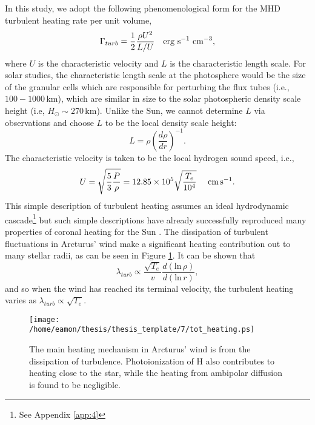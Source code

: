 In this study, we adopt the following phenomenological form for the MHD turbulent heating rate per unit volume,
\begin{equation}
\Gamma_{turb} =\frac{1}{2}\frac{\rho U^{2}}{L/U}\ \ \ \rm{erg \ s^{-1} \ cm^{-3}},
\end{equation} 
where $U$ is the characteristic velocity and $L$ is the characteristic length scale. For solar studies, the characteristic length scale at the photosphere would be the size of the granular cells which are responsible for perturbing the flux tubes (i.e., $100-1000$\,km), which are similar in size to the solar photospheric density scale height (i.e, $H_{\odot} \sim 270$\,km). Unlike the Sun, we cannot determine $L$ via observations and choose $L$ to be the local density scale height:
\begin{equation}
L = \rho \left(\dfrac{d\rho}{dr} \right)^{-1}.
\end{equation}
The characteristic velocity is taken to be the local hydrogen sound speed, i.e., 
\begin{equation}
U=\sqrt{\frac{5}{3}\dfrac{P}{\rho}}=12.85\times 10^{5}\sqrt{\frac{T_{e}}{10^4}}\ \ \ \ \rm{cm}\,\rm{s}^{-1}.
\end{equation}
This simple description of turbulent heating assumes an ideal \cite{kolmogorov_1941} hydrodynamic cascade\footnote{See Appendix \ref{app:4}} but such simple descriptions have already successfully reproduced many properties of coronal heating for the Sun \citep{cranmer_2012}. The dissipation of turbulent fluctuations in Arcturus' wind make a significant heating contribution out to many stellar radii, as can be seen in Figure \ref{fig:7.5}. It can be shown that 
\begin{equation}
\lambda_{turb} \propto \frac{\sqrt{T_e}}{v}\frac{d(\mathrm{ln}\,\rho)}{d(\mathrm{ln}\,r)},
\end{equation} 
and so when the wind has reached its terminal velocity, the turbulent heating varies as $\lambda_{turb} \propto \sqrt{T_e}$.

\begin{figure}[!ht]
\centering 
         \texttt{[image: /home/eamon/thesis/thesis\_template/7/tot\_heating.ps]}
\caption[Main heating mechanisms in Arcturus' wind]{The main heating mechanism in Arcturus' wind is from the dissipation of turbulence. Photoionization of H also contributes to heating close to the star, while the heating from ambipolar diffusion is found to be negligible.}
\label{fig:7.5}
\end{figure}

